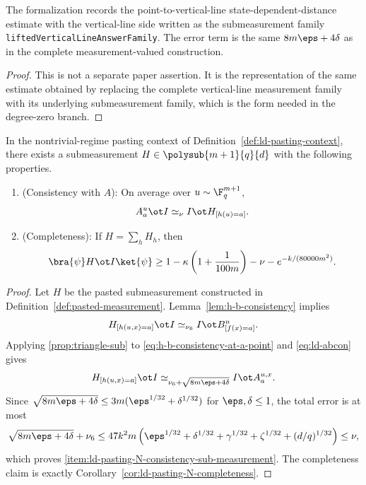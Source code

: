 \begin{lemma}\label{lem:lean-point-vertical-line-sdd-lifted-family}
	\leanok
	The formalization records the point-to-vertical-line state-dependent-distance
	estimate with the vertical-line side written as the submeasurement
	family \texttt{liftedVerticalLineAnswerFamily}. The error term is the same
	\(8m\eps+4\delta\) as in the complete measurement-valued construction.
\end{lemma}
\begin{proof}
	\leanok
	This is not a separate paper assertion. It is the representation of the same
	estimate obtained by replacing the complete vertical-line measurement family
	with its underlying submeasurement family, which is the form needed in
	the degree-zero branch.
\end{proof}

\begin{lemma}\label{lem:ld-pasting-sub-measurement}
	\leanok
	In the nontrivial-regime pasting context of Definition~\ref{def:ld-pasting-context},
	there exists a submeasurement $H \in \polysub{m+1}{q}{d}$ with the following
	properties.
	\begin{enumerate}
		\item (Consistency with $A$): \label{item:ld-pasting-N-consistency-sub-measurement}
		      On average over $u \sim \F_q^{m+1}$,
		      \[
			      A_a^u \ot I \simeq_\nu I \ot H_{[h(u)=a]}.
		      \]
		\item (Completeness): \label{item:ld-pasting-N-completeness-sub-measurement}
		      If $H = \sum_h H_h$, then
		      \[
			      \bra{\psi} H \ot I \ket{\psi}
			      \ge
			      1 - \kappa\left(1+\frac{1}{100m}\right) - \nu - e^{-k/(80000m^2)}.
		      \]
	\end{enumerate}
\end{lemma}
\begin{proof}
	\leanok
	Let $H$ be the pasted submeasurement constructed in Definition~\ref{def:pasted-measurement}. Lemma~\ref{lem:h-b-consistency} implies
	\begin{equation}\label{eq:h-b-consistency-at-a-point}
		H_{[h(u,x)=a]} \ot I \simeq_{\nu_6} I \ot B^u_{[f(x)=a]}.
	\end{equation}
	Applying \ref{prop:triangle-sub} to \ref{eq:h-b-consistency-at-a-point} and \ref{eq:ld-abcon} gives
	\[
		H_{[h(u,x)=a]} \ot I \simeq_{\nu_6+\sqrt{8m\eps+4\delta}} I \ot A_a^{u,x}.
	\]
	Since $\sqrt{8m\eps+4\delta}\le 3m(\eps^{1/32}+\delta^{1/32})$ for $\eps,\delta\le 1$, the total error is at most
	\[
		\sqrt{8m\eps+4\delta}+\nu_6 \le 47k^2m\left(\eps^{1/32}+\delta^{1/32}+\gamma^{1/32}+\zeta^{1/32}+(d/q)^{1/32}\right)\le \nu,
	\]
	which proves \ref{item:ld-pasting-N-consistency-sub-measurement}. The completeness claim is exactly Corollary~\ref{cor:ld-pasting-N-completeness}.
\end{proof}

